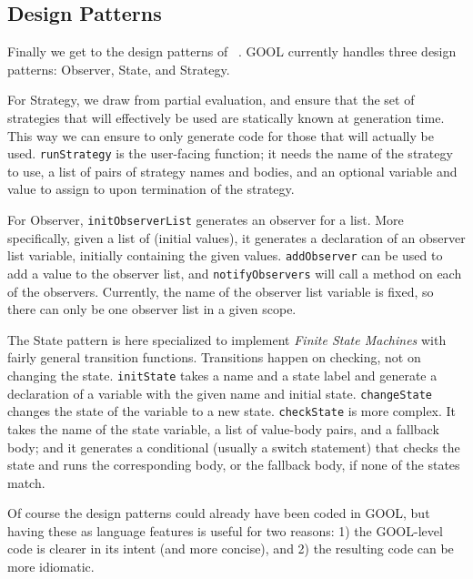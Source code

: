 \documentclass[sigplan,review,anonymous,prologue,dvipsnames]{acmart}
\begin{document}
\subsection{Design Patterns}
Finally we get to the design patterns of ~\cite{gamma1995design}. GOOL
currently handles three design patterns: Observer,
State, and Strategy. 

For Strategy, we draw from partial evaluation, and ensure that the set of
strategies that will effectively be used are statically known at generation
time.  This way we can ensure to only generate code for those that will
actually be used.  \verb|runStrategy| is the user-facing function; it needs the
name of the strategy to use, a list of pairs of strategy names and bodies, and
an optional variable and value to assign to upon termination of the strategy.

For Observer, \verb|initObserverList| generates an observer for a list.  More
specifically, given a list of (initial values), it generates a declaration of
an observer list variable, initially containing the given values.
\verb|addObserver| can be used to add a value to the observer list, and
\verb|notifyObservers| will call a method on each of the observers. Currently,
the name of the observer list variable is fixed, so there can only be one
observer list in a given scope.

The State pattern is here specialized to implement \emph{Finite State Machines}
with fairly general transition functions.  Transitions happen on checking, not
on changing the state.  \verb|initState| takes a name and a state label and
generate a declaration of a variable with the given name and initial state.
\verb|changeState| changes the state of the variable to a new state.
\verb|checkState| is more complex.  It takes the name of the state variable, a
list of value-body pairs, and a fallback body; and it generates a conditional
(usually a switch statement) that checks the state and runs the corresponding
body, or the fallback body, if none of the states match.

Of course the design patterns could already have been coded in GOOL, but
having these as language features is useful for two reasons: 1) the GOOL-level
code is clearer in its intent (and more concise), and 2) the resulting code
can be more idiomatic.
\end{document}
